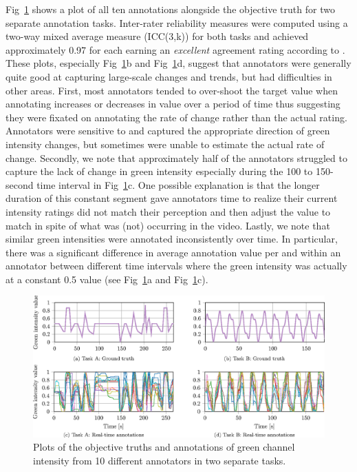 \documentclass[10pt,letterpaper]{article}
\begin{document}
Fig~\ref{Fig:2} shows a plot of all ten annotations alongside the objective truth for two separate annotation tasks.  Inter-rater reliability measures were computed using a two-way mixed average measure (ICC(3,k)) for both tasks and achieved approximately 0.97 for each earning an \textit{excellent} agreement rating according to \cite{cicchetti1994guidelines}.  These plots, especially Fig~\ref{Fig:2}b and Fig~\ref{Fig:2}d, suggest that annotators were generally quite good at capturing large-scale changes and trends, but had difficulties in other areas.  First, most annotators tended to over-shoot the target value when annotating increases or decreases in value over a period of time thus suggesting they were fixated on annotating the rate of change rather than the actual rating.  Annotators were sensitive to and captured the appropriate direction of green intensity changes, but sometimes were unable to estimate the actual rate of change.  Secondly, we note that approximately half of the annotators struggled to capture the lack of change in green intensity especially during the 100 to 150-second time interval in Fig~\ref{Fig:2}c.  One possible explanation is that the longer duration of this constant segment gave annotators time to realize their current intensity ratings did not match their perception and then adjust the value to match in spite of what was (not) occurring in the video.  Lastly, we note that similar green intensities were annotated inconsistently over time.  In particular, there was a significant difference in average annotation value per and within an annotator between different time intervals where the green intensity was actually at a constant 0.5 value (see Fig~\ref{Fig:2}a and Fig~\ref{Fig:2}c).

\begin{figure}[t]
    \begin{adjustwidth}{-2.25in}{0in}
	\centering
    \includegraphics{images/Fig2.eps}
    \vspace{0.2cm}
	\caption{Plots of the objective truths and annotations of green channel intensity from 10 different annotators in two separate tasks.}
	\label{Fig:2}
	\end{adjustwidth}
\end{figure}
\end{document}
